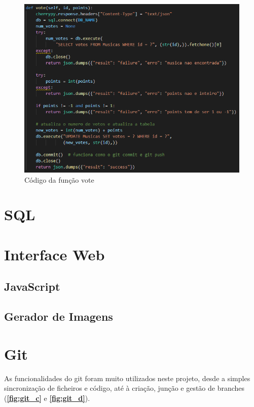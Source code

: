 \documentclass{report}
\begin{document}
\begin{figure}[!h]
\center 
\includegraphics[width=330pt]{img/vote.png}
\caption{Código da função vote}
\label{fig:vote}
\end{figure}
\section{SQL}
\label{sec:sql}

\section{Interface Web}
\label{sec:interfaceWeb}

\subsection{JavaScript}
\label{ssec:JS}

\subsection{Gerador de Imagens}
\label{ssec:geradorImagens}

\section{Git}
\label{sec:git}
As funcionalidades do git foram muito utilizados neste projeto, desde a simples sincronização 
de ficheiros e código, até à criação, junção e gestão de branches (\textbf{\autoref{fig:git_c}} e 
\textbf{\autoref{fig:git_d}}). 
\cite{git}
\end{document}
